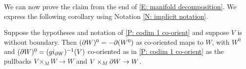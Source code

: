 \begin{comment}
	\begin{proof}
		Again it is clear that $f \times_M g = g|_{W^0}$ as maps.
		Suppose given structural co-orientations.
		As $f$ is an embedding, we have $K_f = 0$, while $V^\perp$ is spanned by $\nu$; note that as $\nu_0$ maps to $\nu$, we write simply $\nu$ in the local decomposition of $TW$.
		The structural co-orientation of $f$ is $(\beta_{W^\perp} \wedge \beta_I, \beta_{W^\perp} \wedge \beta_I \wedge \beta_\nu)$, which agrees with the assumed co-orientation for $f$.
		So the co-orientation of the pullback will be the structural orientation or not according to whether the structural co-orientation of $g$ agrees with the given co-orientation of $g$ or not.
		The structural co-orientation of $g$ is $(\beta_{K_g} \wedge \beta_I \wedge \beta_\nu, \beta_{W^\perp} \wedge \beta_I \wedge \beta_\nu)$, while the structural co-orientation of the pullback is $(\beta_{K_g} \wedge \beta_I, \beta_{W^\perp} \wedge \beta_I \wedge \beta_\nu)$.
		If the given co-orientation for $g$ agrees with the structural orientation, then the claimed co-orientation for $g|_{W^0}$ is the composition of the structural co-orientation for $g$ with $(\beta_{W^0},\beta_{W^0} \wedge \beta_{\nu})$.
		In this last expression we are free to choose any $\beta_{W^0}$ we like, so we can let $\beta_{W^0} = \beta_{K_g} \wedge \beta_I$.
		Then the claimed composite co-orientation is $(\beta_{K_g} \wedge \beta_I, \beta_{W^\perp} \wedge \beta_I \wedge \beta_\nu)$, which agrees with the pullback co-orientation as claimed.
		If the given co-orientation of $g$ disagrees with the structural co-orientation, this changes the sign of both the pullback co-orientation and of the representative of the co-orientation of $g$ used in our composite but not the sign of $(\beta_{W^0},\beta_{W^0} \wedge \beta_{\nu})$.
		So again the pullback co-orientation agrees with the claimed composite.
	\end{proof}
\end{comment}

We can now prove the claim from the end of \cref{E: manifold decomposition}.
We express the following corollary using Notation \ref{N: implicit notation}.

\begin{corollary}\label{C: co-orient W0}
	Suppose the hypotheses and notation of \cref{P: codim 1 co-orient} and suppose $V$ is without boundary.
	Then $(\partial W)^0 = -\partial (W^0)$ as co-oriented maps to $W$, with $W^0$ and $(\partial W)^0 = (gi_{\partial W})^{-1}(V)$ co-oriented as in \cref{P: codim 1 co-orient} as the pullbacks $V \times_M W \to W$ and $V \times_M \partial W \to W$.
\end{corollary}

